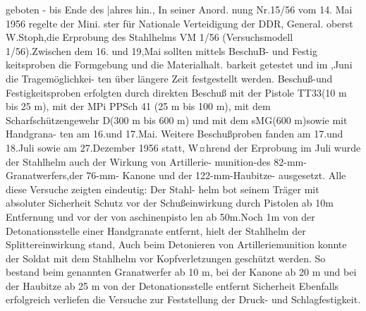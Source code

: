 geboten - bis Ende des |ahres hin., In seiner Anord.
nung Nr.15/56 vom 14. Mai 1956 regelte der Mini.
ster für Nationale Verteidigung der DDR, General.
oberst W.Stoph,die Erprobung des Stahlhelms
VM 1/56 (Versuchsmodell 1/56).Zwischen dem 16.
und 19,Mai sollten mittels BeschuB- und Festig
keitsproben die Formgebung und die Materialhalt.
barkeit getestet und im ,Juni die Tragemöglichkei-
ten über längere Zeit festgestellt werden.
Beschuß-und Festigkeitsproben erfolgten durch
direkten Beschuß mit der Pistole TT33(10 m bis
25 m), mit der MPi PPSch 41 (25 m bis 100 m), mit
dem Scharfschützengewehr D(300 m bis 600 m)
und mit dem sMG(600 m)sowie mit Handgrana-
ten am 16.und 17.Mai. Weitere Beschußproben
fanden am 17.und 18.Juli sowie am 27.Dezember
1956 statt, W¤hrend der Erprobung im Juli wurde
der Stahlhelm auch der Wirkung von Artillerie-
munition-des 82-mm-Granatwerfers,der 76-mm-
Kanone und der 122-mm-Haubitze- ausgesetzt.
Alle diese Versuche zeigten eindeutig: Der Stahl-
helm bot seinem Träger mit absoluter Sicherheit
Schutz vor der Schußeinwirkung durch Pistolen ab
10m Entfernung und vor der von aschinenpisto
len ab 50m.Noch 1m von der Detonationsstelle
einer Handgranate entfernt, hielt der Stahlhelm der
Splittereinwirkung stand, Auch beim Detonieren
von Artilleriemunition konnte der Soldat mit dem
Stahlhelm vor Kopfverletzungen geschützt werden.
So bestand beim genannten Granatwerfer ab 10 m,
bei der Kanone ab 20 m und bei der Haubitze ab
25 m von der Detonationsstelle entfernt Sicherheit
Ebenfalls erfolgreich verliefen die Versuche zur
Feststellung der Druck- und Schlagfestigkeit.

